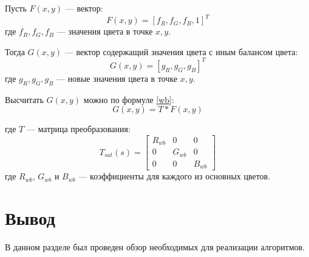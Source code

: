 Пусть $F(x,y)$ --- вектор:
\begin{equation}
	\label{F}
	F(x,y) = [f_R, f_G, f_B, 1]^T
\end{equation}
где $f_R, f_G, f_B$ --- значения цвета в точке $x,y$.

Тогда $G(x,y)$ --- вектор содержащий значения цвета с иным балансом цвета:
\begin{equation}
	\label{G}
	G(x,y) = [g_R, g_G, g_B]^T
\end{equation}
где $g_R, g_G, g_B$ --- новые значения цвета в точке $x,y$.

Высчитать $G(x,y)$ можно по формуле \ref{wb}:
\begin{equation}
	\label{wb}
	G(x,y) = T * F(x,y)
\end{equation}

где $T$ --- матрица преобразования:
\begin{equation}
	\label{twb}
	T_{sat}(s) = \begin{bmatrix}
		R_{wb} & 0 & 0 \\
		0 & G_{wb} & 0 \\ 
		0 & 0 & B_{wb} 
	\end{bmatrix}
\end{equation}
где $R_{wb}$, $G_{wb}$ и $B_{wb}$ --- коэффициенты для каждого из основных цветов.


\section*{Вывод}
В данном разделе был проведен обзор необходимых для реализации алгоритмов.